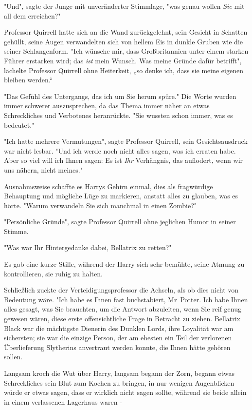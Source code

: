 {"Und", sagte der Junge mit unveränderter Stimmlage, "was genau wollen \emph{Sie} mit all dem erreichen?"

Professor Quirrell hatte sich an die Wand zurückgelehnt, sein Gesicht in Schatten gehüllt, seine Augen verwandelten sich von hellem Eis in dunkle Gruben wie die seiner Schlangenform. "Ich wünsche mir, dass Großbritannien unter einem starken Führer erstarken wird; das \emph{ist} mein Wunsch. Was meine Gründe dafür betrifft", lächelte Professor Quirrell ohne Heiterkeit, „so denke ich, dass sie meine eigenen bleiben werden.“

"Das Gefühl des Untergangs, das ich um Sie herum spüre." Die Worte wurden immer schwerer auszusprechen, da das Thema immer näher an etwas Schreckliches und Verbotenes heranrückte. "Sie wussten schon immer, was es bedeutet."

"Ich hatte mehrere Vermutungen", sagte Professor Quirrell, sein Gesichtsausdruck war nicht lesbar. "Und ich werde noch nicht alles sagen, was ich erraten habe. Aber so viel will ich Ihnen sagen: Es ist \emph{Ihr} Verhängnis, das auflodert, wenn wir uns nähern, nicht meines."

Ausnahmsweise schaffte es Harrys Gehirn einmal, dies als fragwürdige Behauptung und mögliche Lüge zu markieren, anstatt alles zu glauben, was es hörte. "Warum verwandeln Sie sich manchmal in einen Zombie?"

"Persönliche Gründe", sagte Professor Quirrell ohne jeglichen Humor in seiner Stimme.

"Was war Ihr Hintergedanke dabei, Bellatrix zu retten?"

Es gab eine kurze Stille, während der Harry sich sehr bemühte, seine Atmung zu kontrollieren, sie ruhig zu halten.

Schließlich zuckte der Verteidigungsprofessor die Achseln, als ob dies nicht von Bedeutung wäre. "Ich habe es Ihnen fast buchstabiert, Mr~Potter. Ich habe Ihnen alles gesagt, was Sie brauchten, um die Antwort abzuleiten, wenn Sie reif genug gewesen wären, diese erste offensichtliche Frage in Betracht zu ziehen. Bellatrix Black war die mächtigste Dienerin des Dunklen Lords, ihre Loyalität war am sichersten; sie war die einzige Person, der am ehesten ein Teil der verlorenen Überlieferung Slytherins anvertraut werden konnte, die Ihnen hätte gehören sollen.

Langsam kroch die Wut über Harry, langsam begann der Zorn, begann etwas Schreckliches sein Blut zum Kochen zu bringen, in nur wenigen Augenblicken würde er etwas sagen, dass er wirklich nicht sagen sollte, während sie beide allein in einem verlassenen Lagerhaus waren -

}
